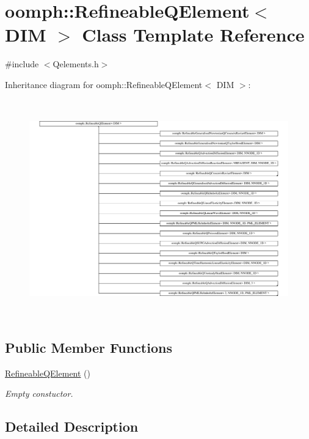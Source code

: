 \hypertarget{classoomph_1_1RefineableQElement}{}\section{oomph\+:\+:Refineable\+Q\+Element$<$ D\+IM $>$ Class Template Reference}
\label{classoomph_1_1RefineableQElement}


{\ttfamily \#include $<$Qelements.\+h$>$}

Inheritance diagram for oomph\+:\+:Refineable\+Q\+Element$<$ D\+IM $>$\+:\begin{figure}[H]
\begin{center}
\leavevmode
\includegraphics[height=9.455910cm]{classoomph_1_1RefineableQElement}
\end{center}
\end{figure}
\subsection*{Public Member Functions}
\begin{DoxyCompactItemize}
\item 
\hyperlink{classoomph_1_1RefineableQElement_af183085df5914c6834d6fe88e817ee01}{Refineable\+Q\+Element} ()
\begin{DoxyCompactList}\small\item\em Empty constuctor. \end{DoxyCompactList}\end{DoxyCompactItemize}


\subsection{Detailed Description}
